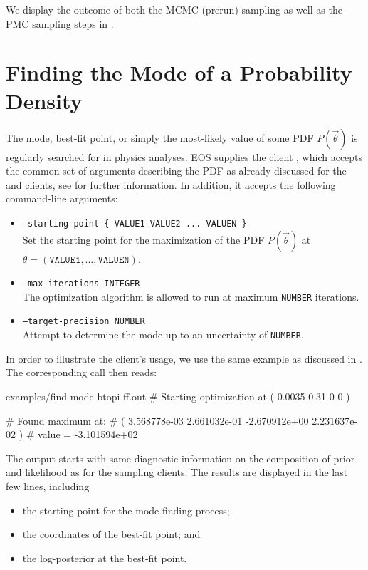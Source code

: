 We display the outcome of both the MCMC (prerun) sampling as well as the PMC sampling steps
in .

\section{Finding the Mode of a Probability Density}
\label{sec:usage:eos-find-mode}

The mode, best-fit point, or simply the most-likely value of some \gls{PDF}
$P(\vec\theta)$ is regularly searched for in physics analyses. EOS supplies the
client , which accepts the common set of arguments
describing the PDF as already discussed for the  and
 clients, see  for
further information.  In addition, it accepts the following command-line
arguments:
\begin{itemize}
    \item[] \texttt{--starting-point \{ VALUE1 VALUE2 ... VALUEN \}}\\[\medskipamount]
        Set the starting point for the maximization of the PDF $P(\vec\theta)$
        at $\theta = ( \texttt{VALUE1}, \dots, \texttt{VALUEN} )$.
    \item[] \texttt{--max-iterations INTEGER}\\[\medskipamount]
        The optimization algorithm is allowed to run at maximum \texttt{NUMBER} iterations.
    \item[] \texttt{--target-precision NUMBER}\\[\medskipamount]
        Attempt to determine the mode up to an uncertainty of \texttt{NUMBER}.
\end{itemize}

In order to illustrate the client's usage, we use the same example as
discussed in . The corresponding call
then reads:

\begin{filecontents*}{examples/find-mode-btopi-ff.out}
# Starting optimization at ( 0.0035 0.31 0 0 )

# Found maximum at: 
#   ( 3.568778e-03 2.661032e-01 -2.670912e+00 2.231637e-02 )
#   value = -3.101594e+02
\end{filecontents*}
The output starts with same diagnostic information on the composition of
prior and likelihood as for the sampling clients. The results are displayed
in the last few lines, including
\begin{itemize}
    \item the starting point for the mode-finding process;
    \item the coordinates of the best-fit point; and
    \item the log-posterior at the best-fit point.
\end{itemize}


